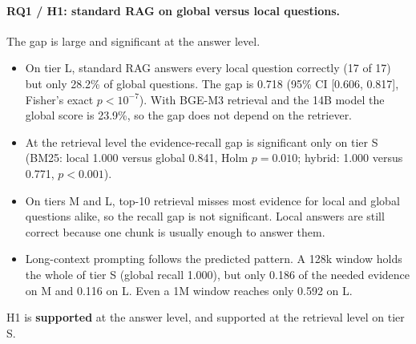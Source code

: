 \documentclass[11pt,letterpaper,oneside]{report}
\begin{document}
\begin{table}[htbp]
\centering\small
\caption{Answer-level results on tier L (89 questions: 71 scored global, 17
local; one free-text question unscored). Latency is wall-clock seconds per
answer. The two LensRAG fast-profile rows are two runs of the same
configuration. Rows marked $^\dagger$ were developed on these questions
(Section~\ref{sec:threats}).}
\label{tab:answers}
\end{table}

\paragraph{RQ1 / H1: standard RAG on global versus local questions.}
The gap is large and significant at the answer level.
\begin{itemize}
  \item On tier L, standard RAG answers every local question correctly (17 of
  17) but only 28.2\% of global questions. The gap is 0.718 (95\% CI
  [0.606, 0.817], Fisher's exact $p<10^{-7}$). With BGE-M3 retrieval and the
  14B model the global score is 23.9\%, so the gap does not depend on the
  retriever.
  \item At the retrieval level the evidence-recall gap is significant only on
  tier S (BM25: local 1.000 versus global 0.841, Holm $p=0.010$; hybrid:
  1.000 versus 0.771, $p<0.001$).
  \item On tiers M and L, top-10 retrieval misses most evidence for local and
  global questions alike, so the recall gap is not significant. Local
  answers are still correct because one chunk is usually enough to answer
  them.
  \item Long-context prompting follows the predicted pattern. A 128k window
  holds the whole of tier S (global recall 1.000), but only 0.186 of the
  needed evidence on M and 0.116 on L. Even a 1M window reaches only 0.592
  on L.
\end{itemize}
H1 is \textbf{supported} at the answer level, and supported at the retrieval
level on tier S.
\end{document}
